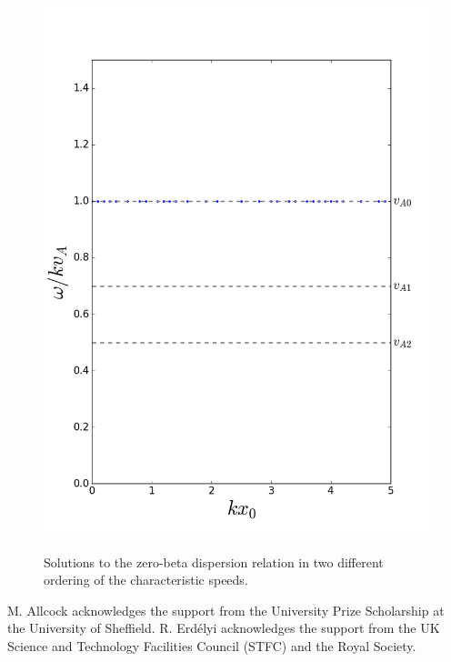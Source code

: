 \documentclass{aastex61}
\begin{document}
\begin{figure}
\begin{center}
{{				\includegraphics{disp_rel_zero_beta_2.png}}}
	\end{center}
	\caption{Solutions to the zero-beta dispersion relation in two different ordering of the characteristic speeds.}
	\label{fig: zero beta}
\end{figure}


















\acknowledgments
M. Allcock acknowledges the support from the University Prize Scholarship at the University of Sheffield. R. Erd\'{e}lyi acknowledges the support from the UK Science and Technology Facilities Council (STFC) and the Royal Society. 

\end{document}
